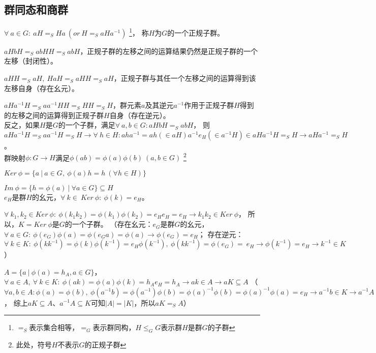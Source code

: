 \subsection{群同态和商群}

$\forall\ a\in G:\ aH=_{S}Ha\ (or\ H=_{S}aHa^{-1})$
\footnote{$=_{S}$表示集合相等，$=_{G}$表示群同构，$H \leq_{G} G$表示群$H$是群$G$的子群}，
称$H$为$G$的一个正规子群。

$aHbH=_{S}abHH=_{S}abH$，正规子群的左移之间的运算结果仍然是正规子群的一个左移（封闭性）。

$aHH=_{S}aH,\ HaH=_{S}aHH=_{S}aH$，正规子群与其任一个左移之间的运算得到该左移自身（存在幺元）。

$aHa^{-1}H=_{S}aa^{-1}HH=_{S}HH=_{S}H$，群元素$a$及其逆元$a^{-1}$作用于正规子群$H$得到的左移之间的运算得到正规子群$H$自身（存在逆元）。
\\

反之，如果$H$是$G$的一个子群，满足$\forall\ a,b\in G:aHbH=_{S}abH$，
则$aHa^{-1}H=_{S}aa^{-1}H=_{S}H
\rightarrow \forall\ h\in H:aha^{-1}=ah(\in aH)a^{-1}e_{H}(\in a^{-1}H)\in aHa^{-1}H=_{S}H
\rightarrow aHa^{-1}=_{S}H$。
\\

群映射$\phi:G\rightarrow H$满足$\phi(ab)=\phi(a)\phi(b)\ (a,b\in G)$
\footnote{此处，符号$H$不表示$G$的正规子群}

$Ker\ \phi=\{a\ |\ a\in G,\ \phi(a)h=h\ (\forall h\in H)\}$

$Im\ \phi=\{h=\phi(a)\ |\ \forall a\in G\}\subseteq H$
\\

$e_{H}$是群$H$的幺元，$\forall\ k\in\ Ker\ \phi:\ \phi(k)=e_{H}$。

$\forall\ k_{1},k_{2}\in Ker\ \phi:\ \phi(k_{1}k_{2})=\phi(k_{1})\phi(k_{2})=e_{H}e_{H}=e_{H}
\rightarrow k_{1}k_{2}\in Ker\ \phi$，
所以，$K=Ker\ \phi$是$G$的一个子群。
（存在幺元：$e_{G}$是群$G$的幺元，
$\forall\ a\in G:\ \phi(e_{G})\phi(a)=\phi(e_{G}a)=\phi(a)\rightarrow \phi(e_{G})=e_{H}$；
存在逆元：$\forall\ k\in K:\ \phi(kk^{-1})=\phi(k)\phi(k^{-1})=e_{H}\phi(k^{-1}),
\ \phi(kk^{-1})=\phi(e_{G})=\ e_{H}
\rightarrow \phi(k^{-1})=e_{H}\rightarrow k^{-1}\in K$）

$A=\{a\ |\ \phi(a)=h_{A}, a\in G\}$，
$\forall\ a\in A,\ \forall\ k\in K:\ \phi(ak)=\phi(a)\phi(k)=h_{A}e_{H}=h_{A}
\rightarrow ak\in A
\rightarrow aK\subseteq A$
（$\forall a,b\in A:\phi(a)=\phi(b),
\ \phi(a^{-1}b)=\phi(a^{-1})\phi(b)=\phi(a)^{-1}\phi(b)=\phi(a)^{-1}\phi(a)=e_{H}
\rightarrow a^{-1}b\in K
\rightarrow a^{-1}A\subseteq K$，
综上$aK\subseteq A$、$a^{-1}A\subseteq K$可知$|A|=|K|$，所以$aK=_{S}A$）

